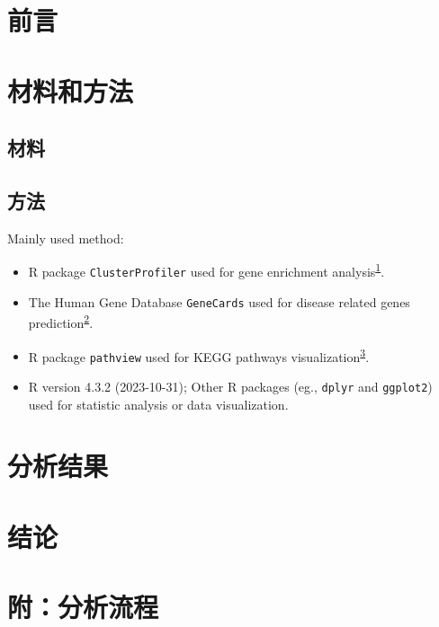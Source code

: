 \documentclass[
]{article}
\providecommand{\tightlist}{%
  \setlength{\itemsep}{0pt}\setlength{\parskip}{0pt}}
\begin{document}
\hypertarget{introduction}{%
\section{前言}\label{introduction}}

\hypertarget{methods}{%
\section{材料和方法}\label{methods}}

\hypertarget{ux6750ux6599}{%
\subsection{材料}\label{ux6750ux6599}}

\hypertarget{ux65b9ux6cd5}{%
\subsection{方法}\label{ux65b9ux6cd5}}

Mainly used method:

\begin{itemize}
\tightlist
\item
  R package \texttt{ClusterProfiler} used for gene enrichment analysis\textsuperscript{\protect\hyperlink{ref-ClusterprofilerWuTi2021}{1}}.
\item
  The Human Gene Database \texttt{GeneCards} used for disease related genes prediction\textsuperscript{\protect\hyperlink{ref-TheGenecardsSStelze2016}{2}}.
\item
  R package \texttt{pathview} used for KEGG pathways visualization\textsuperscript{\protect\hyperlink{ref-PathviewAnRLuoW2013}{3}}.
\item
  R version 4.3.2 (2023-10-31); Other R packages (eg., \texttt{dplyr} and \texttt{ggplot2}) used for statistic analysis or data visualization.
\end{itemize}

\hypertarget{results}{%
\section{分析结果}\label{results}}

\hypertarget{dis}{%
\section{结论}\label{dis}}

\hypertarget{workflow}{%
\section{附：分析流程}\label{workflow}}
\end{document}
